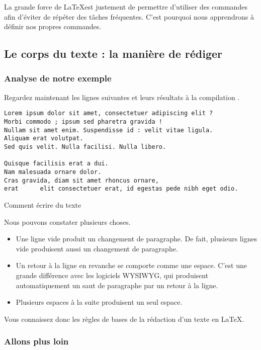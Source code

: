 La grande force de \LaTeX est justement de permettre d'utiliser des commandes afin d'éviter de répéter des tâches fréquentes. C'est pourquoi nous apprendrons à définir nos propres commandes.



\subsection{Le corps du texte : la manière de rédiger}

\subsubsection{Analyse de notre exemple}
Regardez maintenant les lignes suivantes et leurs résultats à la compilation .

\begin{listing}[ht]
\begin{verbatim}
Lorem ipsum dolor sit amet, consectetuer adipiscing elit ?
Morbi commodo ; ipsum sed pharetra gravida !
Nullam sit amet enim. Suspendisse id : velit vitae ligula.
Aliquam erat volutpat.
Sed quis velit. Nulla facilisi. Nulla libero. 

Quisque facilisis erat a dui.
Nam malesuada ornare dolor.
Cras gravida, diam sit amet rhoncus ornare, 
erat      elit consectetuer erat, id egestas pede nibh eget odio.
\end{verbatim}
\caption{Comment écrire du texte}
\end{listing}

Nous pouvons constater plusieurs choses.
\begin{itemize}
\item Une ligne vide produit un changement de paragraphe. De fait, plusieurs lignes vide produisent aussi un changement de paragraphe.
\item Un retour à la ligne en revanche se comporte comme une espace. C'est une grande différence avec les logiciels WYSIWYG, qui produisent automatiquement un saut de paragraphe par un retour à la ligne.
\item Plusieurs espaces à la suite produisent un seul espace. 
\end{itemize}

Vous connaissez donc les règles de bases de la rédaction d'un texte en \LaTeX.

\subsubsection{Allons plus loin}


